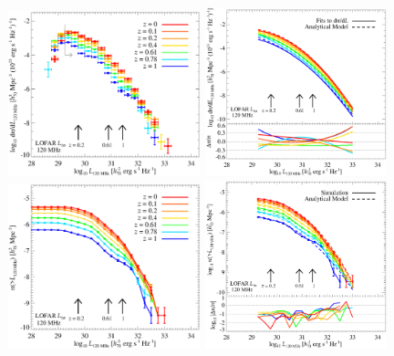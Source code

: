 \documentclass[traditabstract]{aa}
\begin{document}
\begin{figure}[t]
\centering
\includegraphics[width=0.5\textwidth,height=0.305\textheight]{figures/RLF_LOFAR.eps}
\includegraphics[width=0.47\textwidth,height=0.3\textheight]{figures/RLF_LOFAR_analytical_1.eps}
\includegraphics[width=0.5\textwidth,height=0.305\textheight]{figures/CumDensityL_LOFAR.eps}
\includegraphics[width=0.47\textwidth,height=0.3\textheight]{figures/CumDensityL_LOFAR_1.eps}

\end{figure}
\end{document}
